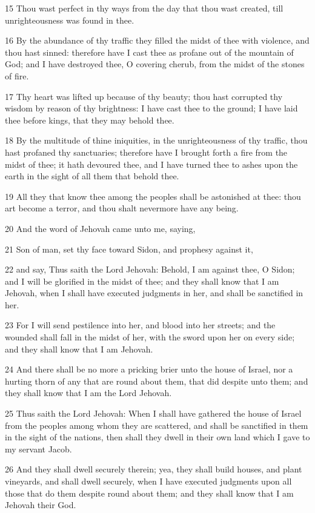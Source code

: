 \par 15 Thou wast perfect in thy ways from the day that thou wast created, till unrighteousness was found in thee.
\par 16 By the abundance of thy traffic they filled the midst of thee with violence, and thou hast sinned: therefore have I cast thee as profane out of the mountain of God; and I have destroyed thee, O covering cherub, from the midst of the stones of fire.
\par 17 Thy heart was lifted up because of thy beauty; thou hast corrupted thy wisdom by reason of thy brightness: I have cast thee to the ground; I have laid thee before kings, that they may behold thee.
\par 18 By the multitude of thine iniquities, in the unrighteousness of thy traffic, thou hast profaned thy sanctuaries; therefore have I brought forth a fire from the midst of thee; it hath devoured thee, and I have turned thee to ashes upon the earth in the sight of all them that behold thee.
\par 19 All they that know thee among the peoples shall be astonished at thee: thou art become a terror, and thou shalt nevermore have any being.
\par 20 And the word of Jehovah came unto me, saying,
\par 21 Son of man, set thy face toward Sidon, and prophesy against it,
\par 22 and say, Thus saith the Lord Jehovah: Behold, I am against thee, O Sidon; and I will be glorified in the midst of thee; and they shall know that I am Jehovah, when I shall have executed judgments in her, and shall be sanctified in her.
\par 23 For I will send pestilence into her, and blood into her streets; and the wounded shall fall in the midst of her, with the sword upon her on every side; and they shall know that I am Jehovah.
\par 24 And there shall be no more a pricking brier unto the house of Israel, nor a hurting thorn of any that are round about them, that did despite unto them; and they shall know that I am the Lord Jehovah.
\par 25 Thus saith the Lord Jehovah: When I shall have gathered the house of Israel from the peoples among whom they are scattered, and shall be sanctified in them in the sight of the nations, then shall they dwell in their own land which I gave to my servant Jacob.
\par 26 And they shall dwell securely therein; yea, they shall build houses, and plant vineyards, and shall dwell securely, when I have executed judgments upon all those that do them despite round about them; and they shall know that I am Jehovah their God.

